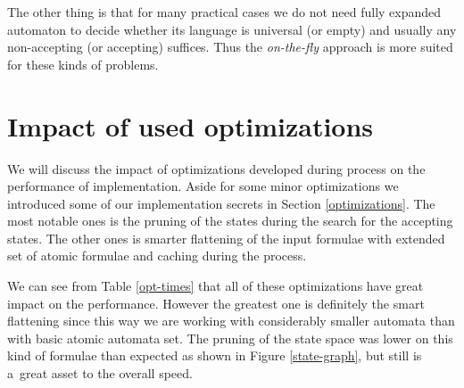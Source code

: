 The other thing is that for many practical cases we do not need fully expanded
automaton to decide whether its language is universal (or empty) and usually any
non-accepting (or accepting) suffices. Thus the \emph{on-the-fly} approach is
more suited for these kinds of problems.

\section{Impact of used optimizations}

We will discuss the impact of optimizations developed during
process on the performance of implementation. Aside for some minor optimizations
we introduced some of our implementation secrets in Section \ref{optimizations}.
The most notable ones is the pruning of the states during the search for the
accepting states. The other ones is smarter flattening of the input formulae
with extended set of atomic formulae and caching during the process.

We can see from Table \ref{opt-times} that all of these optimizations have great
impact on the performance. However the greatest one is definitely the smart
flattening since this way we are working with considerably smaller automata than
with basic atomic automata set. The pruning of the state space was lower on this
kind of formulae than expected as shown in Figure \ref{state-graph}, but still
is a~great asset to the overall speed.

